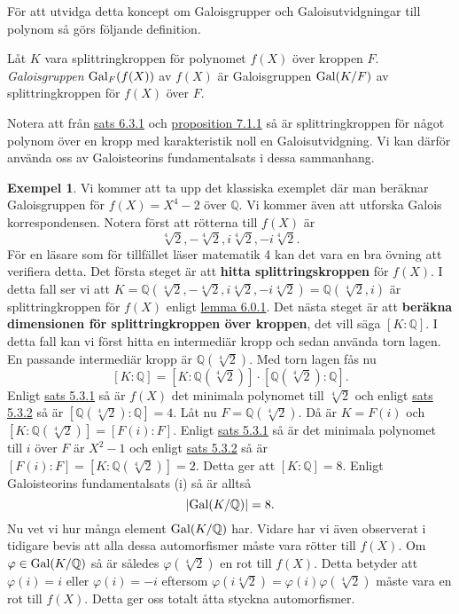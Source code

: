 \documentclass{article}
\newcommand{\gal}[0]{\textnormal{Gal}}
\theoremstyle{definition}
\newtheorem{exmp}[thm]{Exempel}
\begin{document}
För att utvidga detta koncept om Galoisgrupper och Galoisutvidgningar till polynom så görs följande definition.
\begin{mydef}{}{}
  Låt $K$ vara splittringkroppen för polynomet $f(X)$ över kroppen $F$. \textit{Galoisgruppen} $\gal_F(f(X))$ av $f(X)$ är Galoisgruppen 
  $\gal(K/F)$ av splittringkroppen för $f(X)$ över $F$. 
\end{mydef}
Notera att från \hyperlink{sats6.3.1}{sats 6.3.1} och \hyperlink{irrsep}{proposition 7.1.1} så är splittringkroppen för något polynom över en kropp med 
karakteristik noll en Galoisutvidgning. Vi kan därför använda oss av Galoisteorins fundamentalsats i dessa sammanhang. 
\begin{exmp}
  Vi kommer att ta upp det klassiska exemplet där man beräknar Galoisgruppen för $f(X) = X^4 -2$ över $\mathbb{Q}$. Vi kommer även att 
  utforska Galois korrespondensen. Notera först att rötterna till $f(X)$ är 
  \[ \sqrt[4]{2}, -\sqrt[4]{2}, i\sqrt[4]{2}, -i\sqrt[4]{2}.  \]
  För en läsare som för tillfället läser matematik 4 kan det vara en bra övning att verifiera detta.
  Det första steget är att \textbf{hitta splittringskroppen} för $f(X)$. I detta fall ser vi att 
  $K = \mathbb{Q}(\sqrt[4]{2}, -\sqrt[4]{2}, i\sqrt[4]{2}, -i\sqrt[4]{2}) = \mathbb{Q}(\sqrt[4]{2}, i)$
  är splittringkroppen för $f(X)$ enligt \hyperlink{lemma6.0.1}{lemma 6.0.1}. Det nästa steget är att \textbf{beräkna dimensionen för 
  splittringkroppen över kroppen}, det vill säga $[K:\mathbb{Q}]$. I detta fall kan vi först hitta en intermediär kropp 
  och sedan använda torn lagen. En passande intermediär kropp är $\mathbb{Q}(\sqrt[4]{2})$. Med torn lagen fås nu 
  \[ [K:\mathbb{Q}] = [K: \mathbb{Q}(\sqrt[4]{2})] \cdot [\mathbb{Q}(\sqrt[4]{2}): \mathbb{Q}]. \]
  Enligt \hyperlink{minpol}{sats 5.3.1} så är $f(X)$ det minimala polynomet till $\sqrt[4]{2}$ och enligt \hyperlink{5.3.2}{sats 5.3.2} 
  så är $[\mathbb{Q}(\sqrt[4]{2}): \mathbb{Q}] = 4$. Låt nu $F = \mathbb{Q}(\sqrt[4]{2})$. Då är $K = F(i)$ och 
  $[K: \mathbb{Q}(\sqrt[4]{2})] = [F(i): F]$. Enligt \hyperlink{minpol}{sats 5.3.1} så är det minimala polynomet till $i$ över $F$ är $X^2 - 1$ och enligt 
  \hyperlink{5.3.2}{sats 5.3.2} så är $[F(i): F] = [K: \mathbb{Q}(\sqrt[4]{2})] = 2$. Detta ger att $[K:\mathbb{Q}] = 8$.
  Enligt Galoisteorins fundamentalsats (i) så är alltså 
  \[|\gal(K/\mathbb{Q})| = 8.\]
  Nu vet vi hur många element $\gal(K/\mathbb{Q})$ har. Vidare har vi även observerat i tidigare bevis att alla dessa automorfismer 
  måste vara rötter till $f(X)$. Om $\varphi \in \gal(K/\mathbb{Q})$ så är således $\varphi(\sqrt[4]{2})$ en rot till $f(X)$. Detta betyder att 
  $\varphi(i) = i$ eller $\varphi(i) = -i$ eftersom $\varphi(i \sqrt[4]{2}) = \varphi(i) \varphi(\sqrt[4]{2})$ måste vara en rot till $f(X)$. Detta ger 
  oss totalt åtta styckna automorfismer.


\end{exmp}
\end{document}
